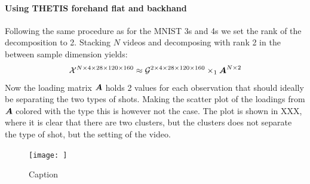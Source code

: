 \paragraph{Using THETIS forehand flat and backhand}
Following the same procedure as for the MNIST 3s and 4s we set the rank of the decomposition to 2. Stacking $N$ videos and decomposing with rank 2 in the between sample dimension yields:
\begin{equation}
    \mathcal{X}^{N\times 4 \times 28 \times 120 \times 160} \approx \mathcal{G}^{2 \times 4 \times 28 \times 120 \times 160} \times_1 \boldsymbol{A}^{N\times 2}
\end{equation}
Now the loading matrix $\boldsymbol{A}$ holds 2 values for each observation that should ideally be separating the two types of shots. Making the scatter plot of the loadings from $\boldsymbol{A}$ colored with the type this is however not the case. The plot is shown in XXX, where it is clear that there are two clusters, but the clusters does not separate the type of shot, but the setting of the video.
\begin{figure}
    \centering
    \texttt{[image: ]}
    \caption{Caption}
    \label{fig:my_label}
\end{figure}